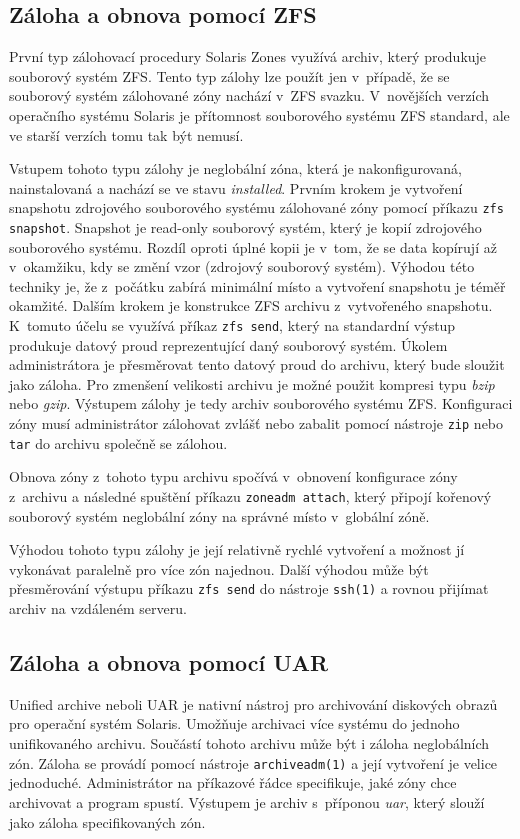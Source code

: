 \subsection{Záloha a obnova pomocí ZFS}
\label{chapter:zones:backup:zfs}
První typ zálohovací procedury Solaris Zones využívá archiv, který produkuje souborový systém ZFS. Tento typ zálohy lze použít
jen v~případě, že se souborový systém zálohované zóny nachází v~ZFS svazku. V~novějších verzích operačního systému Solaris je 
přítomnost souborového systému ZFS standard, ale ve starší verzích tomu tak být nemusí.

Vstupem tohoto typu zálohy je neglobální zóna, která je nakonfigurovaná, nainstalovaná a nachází se ve stavu \textit{installed}.
Prvním krokem je vytvoření snapshotu zdrojového souborového systému zálohované zóny pomocí příkazu \verb|zfs snapshot|. Snapshot
je read-only souborový systém, který je kopií zdrojového souborového systému. Rozdíl oproti úplné kopii je v~tom, že se data 
kopírují až v~okamžiku, kdy se změní vzor (zdrojový souborový systém). Výhodou této techniky je, že z~počátku zabírá minimální místo a
vytvoření snapshotu je téměř okamžité. Dalším krokem je konstrukce ZFS archivu z~vytvořeného snapshotu. K~tomuto účelu se využívá příkaz 
\verb|zfs send|, který na standardní výstup produkuje datový proud reprezentující daný souborový systém. Úkolem administrátora je
přesměrovat tento datový proud do archivu, který bude sloužit jako záloha. Pro zmenšení velikosti archivu je možné použit kompresi 
typu \textit{bzip} nebo \textit{gzip}. Výstupem zálohy je tedy archiv souborového systému ZFS. Konfiguraci zóny musí administrátor 
zálohovat zvlášť nebo zabalit pomocí nástroje \verb|zip| nebo \verb|tar| do archivu společně se zálohou.

Obnova zóny z~tohoto typu archivu spočívá v~obnovení konfigurace zóny z~archivu a následné spuštění příkazu \verb|zoneadm attach|,
který připojí kořenový souborový systém neglobální zóny na správné místo v~globální zóně.

Výhodou tohoto typu zálohy je její relativně rychlé vytvoření a možnost jí vykonávat paralelně pro více zón najednou. Další výhodou
může být přesměrování výstupu příkazu \verb|zfs send| do nástroje \verb|ssh(1)| a rovnou přijímat archiv na vzdáleném serveru.
\subsection{Záloha a obnova pomocí UAR}
\label{chapter:zones:backup:uar}
Unified archive neboli UAR \cite{oracle:solaris:zones:uar} je nativní nástroj pro archivování diskových obrazů pro operační systém
Solaris. Umožňuje archivaci více systému do jednoho unifikovaného archivu. Součástí tohoto archivu může být i záloha neglobálních
zón. Záloha se provádí pomocí nástroje \verb|archiveadm(1)| a její vytvoření je velice jednoduché. Administrátor na příkazové
řádce specifikuje, jaké zóny chce archivovat a program spustí. Výstupem je archiv s~příponou \textit{uar}, který slouží jako záloha
specifikovaných zón.

